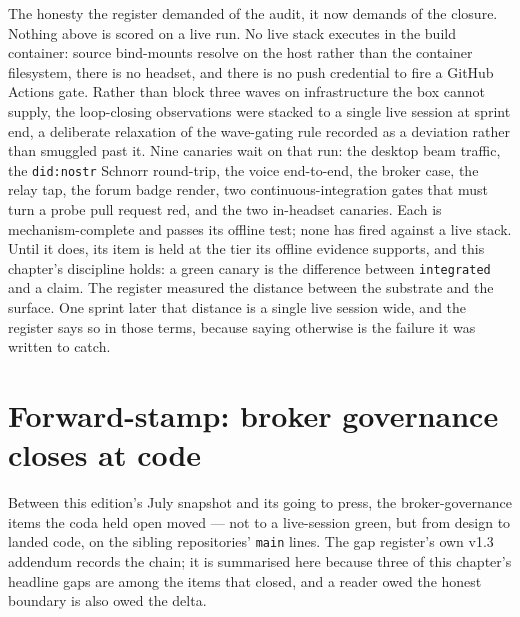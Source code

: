 The honesty the register demanded of the audit, it now demands of the closure. Nothing above is scored on a live run. No live stack executes in the build container: source bind-mounts resolve on the host rather than the container filesystem, there is no headset, and there is no push credential to fire a GitHub Actions gate. Rather than block three waves on infrastructure the box cannot supply, the loop-closing observations were stacked to a single live session at sprint end, a deliberate relaxation of the wave-gating rule recorded as a deviation rather than smuggled past it. Nine canaries wait on that run: the desktop beam traffic, the \texttt{did:nostr} Schnorr round-trip, the voice end-to-end, the broker case, the relay tap, the forum badge render, two continuous-integration gates that must turn a probe pull request red, and the two in-headset canaries. Each is mechanism-complete and passes its offline test; none has fired against a live stack. Until it does, its item is held at the tier its offline evidence supports, and this chapter's discipline holds: a green canary is the difference between \texttt{integrated} and a claim. The register measured the distance between the substrate and the surface. One sprint later that distance is a single live session wide, and the register says so in those terms, because saying otherwise is the failure it was written to catch.

\section{Forward-stamp: broker governance closes at code}

Between this edition's July snapshot and its going to press, the broker-governance items the coda held open moved --- not to a live-session green, but from design to landed code, on the sibling repositories' \texttt{main} lines. The gap register's own v1.3 addendum records the chain; it is summarised here because three of this chapter's headline gaps are among the items that closed, and a reader owed the honest boundary is also owed the delta.

